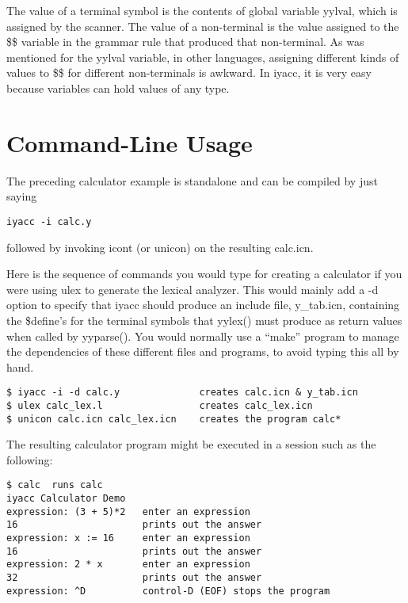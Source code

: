 \documentclass[letterpaper,12pt]{article}
\begin{document}
The value of a terminal symbol is the contents of global variable
yylval, which is assigned by the scanner. The value of a non-terminal
is the value assigned to the \$\$ variable in the grammar rule that
produced that non-terminal. As was mentioned for the yylval variable,
in other languages, assigning different kinds of values to \$\$ for
different non-terminals is awkward. In iyacc, it is very easy because
variables can hold values of any type.

\section{Command-Line Usage}

The preceding calculator example is standalone and can be compiled by
just saying

\begin{verbatim}
iyacc -i calc.y
\end{verbatim}

followed by invoking icont (or unicon) on the resulting calc.icn.

Here is the sequence of commands you would type for creating a calculator 
if you were using ulex to generate the lexical analyzer. This would
mainly add a -d option to specify that iyacc should produce an include
file, y\_tab.icn, containing the \$define's for the terminal symbols
that yylex() must produce as return values when called by yyparse().
You would normally use a ``make'' program to manage the dependencies of 
these different files and programs, to avoid typing this all by hand.

\begin{verbatim}
$ iyacc -i -d calc.y              creates calc.icn & y_tab.icn
$ ulex calc_lex.l                 creates calc_lex.icn
$ unicon calc.icn calc_lex.icn    creates the program calc*
\end{verbatim}

The resulting calculator program might be executed in a session such
as the following:

\begin{verbatim}
$ calc  runs calc
iyacc Calculator Demo
expression: (3 + 5)*2   enter an expression
16                      prints out the answer
expression: x := 16     enter an expression
16                      prints out the answer
expression: 2 * x       enter an expression
32                      prints out the answer
expression: ^D          control-D (EOF) stops the program
\end{verbatim}
\end{document}
